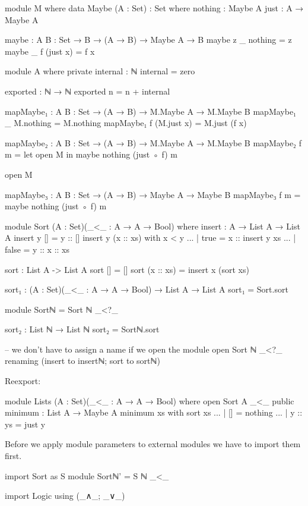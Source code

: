 \begin{code}
module M where
  data Maybe (A : Set) : Set where
    nothing : Maybe A
    just    : A → Maybe A

  maybe : {A B : Set} → B → (A → B) → Maybe A → B
  maybe z _ nothing  = z
  maybe _ f (just x) = f x

module A where
  private
    internal : ℕ
    internal = zero

  exported : ℕ → ℕ
  exported n = n + internal


mapMaybe₁ : {A B : Set} → (A → B) → M.Maybe A → M.Maybe B
mapMaybe₁ _ M.nothing = M.nothing
mapMaybe₁ f (M.just x) = M.just (f x)

mapMaybe₂ : {A B : Set} → (A → B) → M.Maybe A → M.Maybe B
mapMaybe₂ f m = let open M in maybe nothing (just ◦ f) m

open M

mapMaybe₃ : {A B : Set} → (A → B) → Maybe A → Maybe B
mapMaybe₃ f m = maybe nothing (just ◦ f) m

module Sort (A : Set)(_<_ : A → A → Bool) where
  insert : A → List A → List A
  insert y [] = y :: []
  insert y (x :: xs) with x < y
  ... | true = x :: insert y xs
  ... | false = y :: x :: xs

  sort : List A -> List A
  sort [] = []
  sort (x :: xs) = insert x (sort xs)

sort₁ : (A : Set)(_<_ : A → A → Bool) → List A → List A
sort₁ = Sort.sort

module Sortℕ = Sort ℕ _<?_

sort₂ : List ℕ → List ℕ
sort₂ = Sortℕ.sort

-- we don't have to assign a name if we open the module
open Sort ℕ _<?_ renaming (insert to insertℕ; sort to sortℕ)
\end{code}

Reexport:
\begin{code}
module Lists (A : Set)(_<_ : A → A → Bool) where
  open Sort A _<_ public
  minimum : List A → Maybe A
  minimum xs with sort xs
  ... | []      = nothing
  ... | y :: ys = just y
\end{code}

Before we apply module parameters to external modules we
have to import them first.
\begin{code}
import Sort as S
module Sortℕ' = S ℕ _<_
\end{code}

\begin{code}
import Logic using (_∧_; _∨_)
\end{code}


